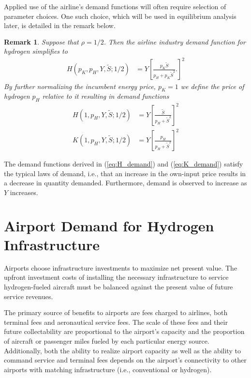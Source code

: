\documentclass[a4paper, 14pt]{article}
\newtheorem{remark}{Remark}
\begin{document}
Applied use of the airline's demand functions will often require selection of parameter choices.
One such choice, which will be used in equilibrium analysis later, is detailed in the remark below.
\begin{remark}
    Suppose that $\rho = 1/2$.
    Then the airline industry demand function for hydrogen simplifies to
    \begin{align}
        H(p_K,p_H,Y,\tilde{S};1/2) &= Y \left[ \frac{p_K \tilde{S}}{p_H + p_K\tilde{S}^2}. \right]^2 \nonumber
    \end{align}
    By further normalizing the incumbent energy price, $p_K = 1$ we define the price of hydrogen $p_H$ relative to it resulting in demand functions
    \begin{align}
        H(1,p_H,Y,\tilde{S};1/2) &= Y \left[ \frac{\tilde{S}}{p_H + \tilde{S}^2} \right]^2 \nonumber \\
        K(1,p_H,Y,\tilde{S};1/2) &= Y \left[ \frac{p_H}{p_H + \tilde{S}^2} \right]^2 \nonumber
    \end{align}
\end{remark}
The demand functions derived in (\ref{eq:H_demand}) and (\ref{eq:K_demand}) satisfy the typical laws of demand, i.e., that an increase in the own-input price results in a decrease in quantity demanded. Furthermore, demand is observed to increase as $Y$ increases.

\section{Airport Demand for Hydrogen Infrastructure}
\label{sec:airport_demand}
Airports choose infrastructure investments to maximize net present value.
The upfront investment costs of installing the necessary infrastructure to service hydrogen-fueled aircraft must be balanced against the present value of future service revenues.

The primary source of benefits to airports are fees charged to airlines, both terminal fees and aeronautical service fees.
The scale of these fees and their future collectability are proportional to the airport's capacity and the proportion of aircraft or passenger miles fueled by each particular energy source.
Additionally, both the ability to realize airport capacity as well as the ability to command service and terminal fees depends on the airport's connectivity to other airports with matching infrastructure (i.e., conventional or hydrogen).
\end{document}
